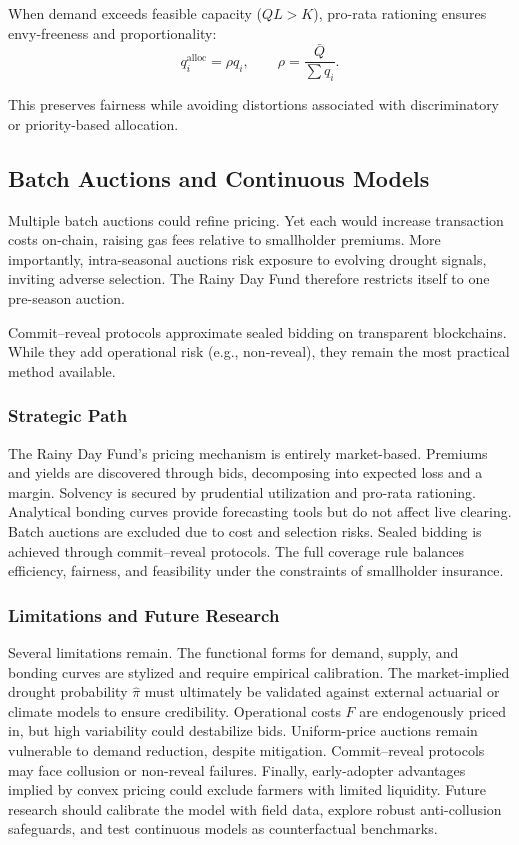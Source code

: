 \documentclass[11pt,a4paper]{article}
\begin{document}
When demand exceeds feasible capacity ($QL > K$), pro-rata rationing ensures envy-freeness and proportionality:
\[
q_i^{\text{alloc}} = \rho q_i, \qquad \rho = \frac{\bar{Q}}{\sum q_i}.
\]

This preserves fairness while avoiding distortions associated with discriminatory or priority-based allocation.  

	\subsection{Batch Auctions and Continuous Models}

Multiple batch auctions could refine pricing. Yet each would increase transaction costs on-chain, raising gas fees relative to smallholder premiums. More importantly, intra-seasonal auctions risk exposure to evolving drought signals, inviting adverse selection. The Rainy Day Fund therefore restricts itself to one pre-season auction.  

Commit--reveal protocols approximate sealed bidding on transparent blockchains. While they add operational risk (e.g., non-reveal), they remain the most practical method available.  

	\subsubsection{Strategic Path}

The Rainy Day Fund’s pricing mechanism is entirely market-based. Premiums and yields are discovered through bids, decomposing into expected loss and a margin. Solvency is secured by prudential utilization and pro-rata rationing. Analytical bonding curves provide forecasting tools but do not affect live clearing. Batch auctions are excluded due to cost and selection risks. Sealed bidding is achieved through commit--reveal protocols. The full coverage rule balances efficiency, fairness, and feasibility under the constraints of smallholder insurance.  

	\subsubsection{Limitations and Future Research}

Several limitations remain. The functional forms for demand, supply, and bonding curves are stylized and require empirical calibration. The market-implied drought probability $\hat{\pi}$ must ultimately be validated against external actuarial or climate models to ensure credibility. Operational costs $F$ are endogenously priced in, but high variability could destabilize bids. Uniform-price auctions remain vulnerable to demand reduction, despite mitigation. Commit--reveal protocols may face collusion or non-reveal failures. Finally, early-adopter advantages implied by convex pricing could exclude farmers with limited liquidity. Future research should calibrate the model with field data, explore robust anti-collusion safeguards, and test continuous models as counterfactual benchmarks.  
\end{document}
